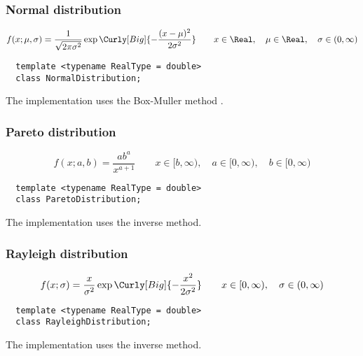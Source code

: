\subsubsection{Normal distribution}

\begin{equation*}
  f(x;\mu,\sigma) =
  \frac{1}{\sqrt{2\pi\sigma^2}}
  \exp\Curly[Big]{-\frac{(x-\mu)^2}{2\sigma^2}} \qquad
  x \in \Real,\quad \mu \in \Real,\quad \sigma \in (0, \infty)
\end{equation*}
\begin{Verbatim}
  template <typename RealType = double>
  class NormalDistribution;
\end{Verbatim}
The implementation uses the Box-Muller method \cite{Box:1958hv}.

\subsubsection{Pareto distribution}

\begin{equation*}
  f(x;a,b) = \frac{a b^a}{x^{a + 1}} \qquad
  x \in [b, \infty),\quad a \in [0, \infty),\quad b \in [0, \infty)
\end{equation*}
\begin{Verbatim}
  template <typename RealType = double>
  class ParetoDistribution;
\end{Verbatim}
The implementation uses the inverse method.

\subsubsection{Rayleigh distribution}

\begin{equation*}
  f(x;\sigma) =
  \frac{x}{\sigma^2}\exp\Curly[Big]{-\frac{x^2}{2\sigma^2}} \qquad
  x \in [0, \infty),\quad \sigma \in (0, \infty)
\end{equation*}
\begin{Verbatim}
  template <typename RealType = double>
  class RayleighDistribution;
\end{Verbatim}
The implementation uses the inverse method.

